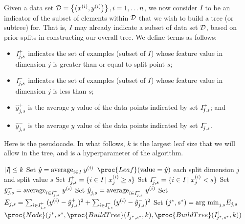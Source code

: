 Given a data set ${\cal D} = \left\{\left(x^{(i)},
  y^{(i)}\right)\right\}, i = 1, \ldots n$, we now consider ${\emph I}$ to be an indicator
of the subset of elements within ${\cal D}$ that we wish to build a tree (or subtree) for.
That is, ${\emph I}$ may already indicate a subset of data set ${\cal D}$, based on
prior splits in constructing our overall tree. We define terms as follows:


\begin{itemize}
  \item ${\emph I}^+_{j,s}$ indicates the set of examples (subset of
        ${\emph I}$) whose feature value in dimension $j$ is greater than or
        equal to split point $s$;
  \item ${\emph I}^-_{j,s}$ indicates the set of examples (subset of
        ${\emph I}$) whose feature value in dimension $j$ is less than $s$;
  \item $\hat{y}^+_{j,s}$ is the average $y$ value of the data points
        indicated by set ${\emph I}^+_{j,s}$; and
  \item $\hat{y}^-_{j,s}$ is the average $y$ value of the data points
        indicated by set ${\emph I}^-_{j,s}$.
\end{itemize}

Here is the pseudocode. In what follows, $k$ is the largest leaf
size that we will allow in the tree, and is a hyperparameter of the algorithm.
\begin{codebox}
  \li  \If $|{\emph I}| \leq k$
  \Then
  \li    Set $\hat{y} = {\rm average}_{i \in {\emph I}}~y^{(i)}$
  \li    \Return $\proc{Leaf}({\rm value} = \hat{y})$
  \li  \Else
  \li   \For each split dimension $j$ and split value $s$
  \li     \Do
  Set ${\emph I}^+_{j,s} = \{i \in {\emph I} \mid x_j^{(i)} \geq s\}$
  \li Set ${\emph I}^-_{j,s} = \{i \in {\emph I} \mid x_j^{(i)} < s\}$
  \li Set $\hat{y}^+_{j,s} = {\rm average}_{i \in {\emph I}^+_{j,s}} ~ y^{(i)}$
  \li Set $\hat{y}^-_{j,s} = {\rm average}_{i \in {\emph I}^-_{j,s}} ~ y^{(i)}$
  \li Set $E_{j,s} = \sum_{i \in {\emph I}^+_{j,s}} (y^{(i)} - \hat{y}^+_{j,s})^2 +
    \sum_{i \in {\emph I}^-_{j,s}} (y^{(i)} - \hat{y}^-_{j,s})^2$
  \End
  \li        Set $(j^*, s^*) = {\rm arg~min}_{j,s} E_{j,s}$
  \End
  \li    \Return $\proc{Node}(j^*, s^*, \proc{BuildTree}({\emph I}^-_{j^*, s^*}, k), \proc{BuildTree}({\emph I}^+_{j^*, s^*}, k))$
\end{codebox}

